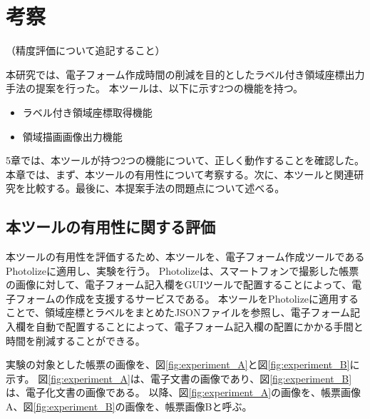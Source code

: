 \chapter{考察}\label{cha:Discussion}
（精度評価について追記すること）

本研究では、電子フォーム作成時間の削減を目的としたラベル付き領域座標出力手法の提案を行った。
本ツールは、以下に示す2つの機能を持つ。

\begin{itemize}
  \item ラベル付き領域座標取得機能
  \item 領域描画画像出力機能
\end{itemize}

5章では、本ツールが持つ2つの機能について、正しく動作することを確認した。
本章では、まず、本ツールの有用性について考察する。次に、本ツールと関連研究を比較する。最後に、本提案手法の問題点について述べる。

\section{本ツールの有用性に関する評価}\label{sec:evalue_usefulness}
本ツールの有用性を評価するため、本ツールを、電子フォーム作成ツールであるPhotolize\cite{Photolize}に適用し、実験を行う。
Photolizeは、スマートフォンで撮影した帳票の画像に対して、電子フォーム記入欄をGUIツールで配置することによって、電子フォームの作成を支援するサービスである。
本ツールをPhotolizeに適用することで、領域座標とラベルをまとめたJSONファイルを参照し、電子フォーム記入欄を自動で配置することによって、電子フォーム記入欄の配置にかかる手間と時間を削減することができる。

実験の対象とした帳票の画像を、図\ref{fig:experiment_A}と図\ref{fig:experiment_B}に示す。
図\ref{fig:experiment_A}は、電子文書の画像であり、図\ref{fig:experiment_B}は、電子化文書の画像である。
以降、図\ref{fig:experiment_A}の画像を、帳票画像A、図\ref{fig:experiment_B}の画像を、帳票画像Bと呼ぶ。


